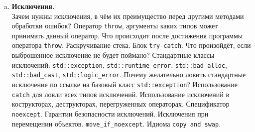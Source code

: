 \documentclass{article}
\begin{document}
\begin{enumerate}
\begin{enumerate}[a.]
\item \textbf{Исключения.}\\
Зачем нужны исключения, в чём их преимущество перед другими методами обработки ошибок?
Оператор \texttt{throw}, аргументы каких типов может принимать данный оператор. Что происходит после достижения программы оператора \texttt{throw}. Раскручивание стека. Блок \texttt{try-catch}. Что произойдёт, если выброшенное исключение не будет поймано? Стандартные классы исключений: \texttt{std::exception}, \texttt{std::runtime\_error}, \texttt{std::bad\_alloc}, \texttt{std::bad\_cast}, \texttt{std::logic\_error}. Почему желательно ловить стандартные исключение по ссылке на базовый класс \texttt{std::exception}? Использование \texttt{catch} для ловли всех типов исключений. Использование исключений в кострукторах, деструкторах, перегруженных операторах. Спецификатор \texttt{noexcept}. Гарантии безопасности исключений. Исключения при перемещении объектов. \texttt{move\_if\_noexcept}. Идиома \texttt{copy and swap}.

\end{enumerate}
\end{enumerate}














\ifx
\end{document}
